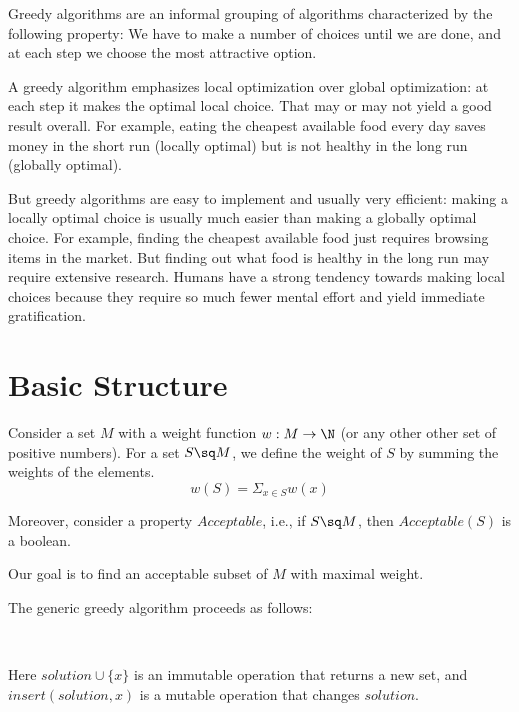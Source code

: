 Greedy algorithms are an informal grouping of algorithms characterized by the following property: We have to make a number of choices until we are done, and at each step we choose the most attractive option.

A greedy algorithm emphasizes local optimization over global optimization: at each step it makes the optimal local choice.
That may or may not yield a good result overall.
For example, eating the cheapest available food every day saves money in the short run (locally optimal) but is not healthy in the long run (globally optimal).

But greedy algorithms are easy to implement and usually very efficient: making a locally optimal choice is usually much easier than making a globally optimal choice.
For example, finding the cheapest available food just requires browsing items in the market.
But finding out what food is healthy in the long run may require extensive research.
Humans have a strong tendency towards making local choices because they require so much fewer mental effort and yield immediate gratification.

\section{Basic Structure}

Consider a set $M$ with a weight function $w:M\to \N$ (or any other other set of positive numbers).
For a set $S\sq M$, we define the weight of $S$ by summing the weights of the elements.
 \[w(S)=\Sigma_{x\in S} w(x)\]

Moreover, consider a property $Acceptable$, i.e., if $S\sq M$, then $Acceptable(S)$ is a boolean.

Our goal is to find an acceptable subset of $M$ with maximal weight.

The generic greedy algorithm proceeds as follows:
\begin{acode}
\\
\end{acode}
Here $solution \cup \{x\}$ is an immutable operation that returns a new set, and $insert(solution,x)$ is a mutable operation that changes $solution$.


